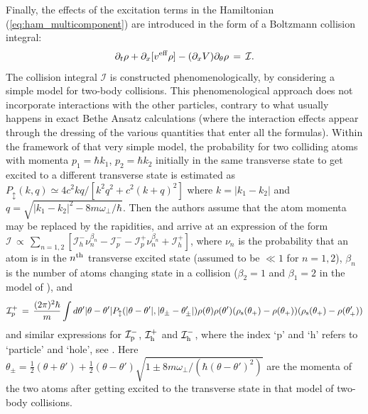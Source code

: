 \documentclass[onecolumn,amsfonts,showpacs,superscriptaddress]{revtex4-1}
\begin{document}
Finally, the effects of the excitation terms in the Hamiltonian (\ref{eq:ham_multicomponent}) are introduced in the form of a Boltzmann collision integral:
\begin{equation}
    \label{eq:Boltzmann-Moller}
    \partial_t \rho + \partial_x [v^{\rm eff} \rho] - (\partial_x V) \partial_\theta \rho \, = \, \mathcal{I} .
\end{equation}
The collision integral $\mathcal{I}$ is constructed phenomenologically, by considering a simple model for two-body collisions. This phenomenological approach does not incorporate interactions with the other particles, contrary to what usually happens in exact Bethe Ansatz calculations (where the interaction effects appear through the dressing of the various quantities that enter all the formulas). Within the framework of that very simple model, the probability for two colliding atoms with momenta $p_1 = \hbar k_1$, $p_2 =\hbar k_2$ initially in the same transverse state to get excited to a different transverse state is estimated as $P_{\updownarrow} (k,q) \simeq 4 c^2 k q /[k^2 q^2 + c^2 (k+q)^2 ]$ where $k = |k_1-k_2|$ and $q= \sqrt{ |k_1-k_2|^2  - 8 m \omega_\perp/\hbar }$. Then the authors assume that the atom momenta may be replaced by the rapidities, and arrive at an expression of the form
$\mathcal{I} \, \propto \, \sum_{n=1,2} [ \mathcal{I}^-_h \nu_n^{\beta_n} - \mathcal{I}^-_p - \mathcal{I}^+_p \nu_n^{\beta_n} + \mathcal{I}_h^+ ]$, 
where $\nu_n$ is the probability that an atom is in the $n^{\rm th}$ transverse excited state (assumed to be $\ll 1$ for $n=1,2$), $\beta_n$ is the number of atoms changing state in a collision ($\beta_2 = 1$ and $\beta_1 = 2$ in the model of \citep{moller_extension_2021}), and
\begin{equation}
\label{eq:collisionIntegralMoeller}
    \mathcal{I}^+_p \, = \, \frac{(2\pi)^2 \hbar}{m} \int d\theta' |\theta-\theta'| P_{\updownarrow} (|\theta-\theta'|, |\theta_\pm - \theta'_\pm |) \rho (\theta) \rho (\theta') (\rho_{\rm s}(\theta_+)- \rho (\theta_+)) ( \rho_{\rm s}(\theta_+) - \rho(\theta'_+))
\end{equation}
and similar expressions for $\mathcal{I}^-_{\rm p}$, $\mathcal{I}^+_{\rm h}$ and $\mathcal{I}^-_{\rm h}$, where the index `p' and `h' refers to `particle' and `hole', see \citep{moller_extension_2021}. Here $\theta_\pm = \frac{1}{2}(\theta + \theta') + \frac{1}{2}(\theta - \theta') \sqrt{1 \pm 8 m \omega_\perp/(\hbar (\theta-\theta')^2)}$ are the momenta of the two atoms after getting excited to the transverse state in that model of two-body collisions.
\end{document}
